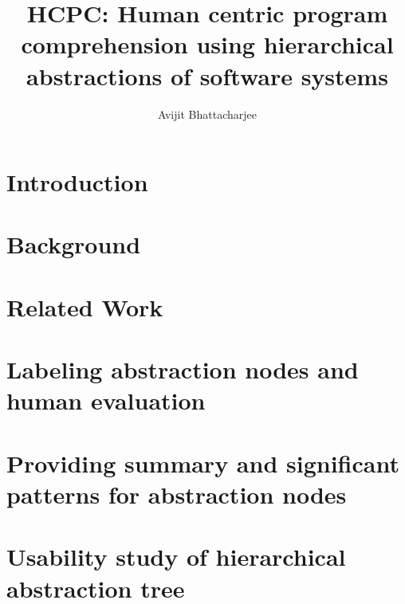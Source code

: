 \documentclass{uofsthesis-cs}
\title{HCPC: Human centric program comprehension using hierarchical abstractions of software systems}
\author{Avijit Bhattacharjee}
\begin{document}
\maketitle

\frontmatter


\chapter{Introduction}




%
% 
% 
%


\chapter{Background}


\chapter{Related Work}


\chapter{ Labeling abstraction nodes and human evaluation}


\chapter{ Providing summary and significant patterns for abstraction nodes}


\chapter{Usability study of hierarchical abstraction tree}

\end{document}
